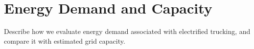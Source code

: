 \section{Energy Demand and Capacity}
Describe how we evaluate energy demand associated with electrified trucking, and compare it with estimated grid capacity.
